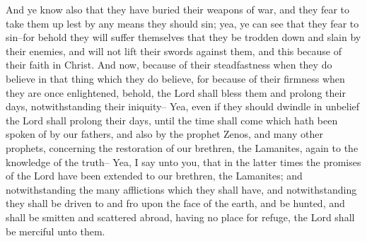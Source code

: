 \bverse \iffalse And ye know also that they have buried their weapons of war, and they fear to take them up lest by any means they should sin; yea, ye can see that they fear to sin--for behold they will suffer themselves that they be trodden down and slain by their enemies, and will not lift their swords against them, and this because of their faith in Christ. \fi
And ye know also that they have buried their weapons of war, and they fear to take them up lest by any means they should sin; yea, ye can see that they fear to sin--for behold they will suffer themselves that they be trodden down and slain by their enemies, and will not lift their swords against them, and this because of their faith in Christ.
\bverse \iffalse And now, because of their steadfastness when they do believe in that thing which they do believe, for because of their firmness when they are once enlightened, behold, the Lord shall bless them and prolong their days, notwithstanding their iniquity-- \fi
And now, because of their steadfastness when they do believe in that thing which they do believe, for because of their firmness when they are once enlightened, behold, the Lord shall bless them and prolong their days, notwithstanding their iniquity--
\bverse \iffalse Yea, even if they should dwindle in unbelief the Lord shall prolong their days, until the time shall come which hath been spoken of by our fathers, and also by the prophet Zenos, and many other prophets, concerning the restoration of our brethren, the Lamanites, again to the knowledge of the truth-- \fi
Yea, even if they should dwindle in unbelief the Lord shall prolong their days, until the time shall come which hath been spoken of by our fathers, and also by the prophet Zenos, and many other prophets, concerning the restoration of our brethren, the Lamanites, again to the knowledge of the truth--
\bverse \iffalse Yea, I say unto you, that in the latter times the promises of the Lord have been extended to our brethren, the Lamanites; and notwithstanding the many afflictions which they shall have, and notwithstanding they shall be driven to and fro upon the face of the earth, and be hunted, and shall be smitten and scattered abroad, having no place for refuge, the Lord shall be merciful unto them. \fi
Yea, I say unto you, that in the latter times the promises of the Lord have been extended to our brethren, the Lamanites; and notwithstanding the many afflictions which they shall have, and notwithstanding they shall be driven to and fro upon the face of the earth, and be hunted, and shall be smitten and scattered abroad, having no place for refuge, the Lord shall be merciful unto them.
